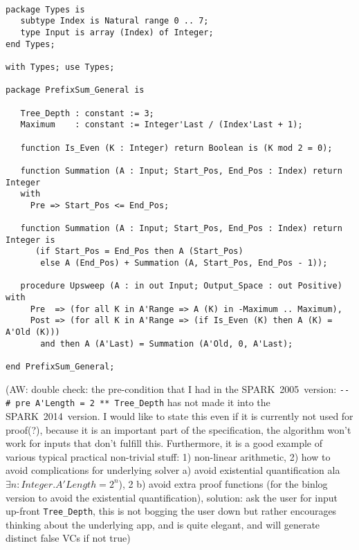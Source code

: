 \documentclass[sttt,draft]{svjour}
\newcommand{\oldspark}{SPARK~2005\xspace}
\newcommand{\newspark}{SPARK~2014\xspace}
\begin{document}
\begin{footnotesize}
\begin{verbatim}

package Types is
   subtype Index is Natural range 0 .. 7;
   type Input is array (Index) of Integer;
end Types;

with Types; use Types;

package PrefixSum_General is

   Tree_Depth : constant := 3;
   Maximum    : constant := Integer'Last / (Index'Last + 1);

   function Is_Even (K : Integer) return Boolean is (K mod 2 = 0);

   function Summation (A : Input; Start_Pos, End_Pos : Index) return Integer
   with
     Pre => Start_Pos <= End_Pos;

   function Summation (A : Input; Start_Pos, End_Pos : Index) return Integer is
      (if Start_Pos = End_Pos then A (Start_Pos)
       else A (End_Pos) + Summation (A, Start_Pos, End_Pos - 1));

   procedure Upsweep (A : in out Input; Output_Space : out Positive) with
     Pre  => (for all K in A'Range => A (K) in -Maximum .. Maximum),
     Post => (for all K in A'Range => (if Is_Even (K) then A (K) = A'Old (K)))
       and then A (A'Last) = Summation (A'Old, 0, A'Last);

end PrefixSum_General;

\end{verbatim}
\end{footnotesize}
%
(AW: double check: the pre-condition that I had in the \oldspark\
version: \verb|--# pre A'Length = 2 ** Tree_Depth| has not made it
into the \newspark\ version. I would like to state this even if it is
currently not used for proof(?), because it is an important part of
the specification, the algorithm won't work for inputs that don't
fulfill this. Furthermore, it is a good example of various typical
practical non-trivial stuff: 1) non-linear arithmetic, 2) how to avoid
complications for underlying solver a) avoid existential
quantification ala $\exists n: Integer. A'Length = 2^n$), 2 b) avoid
extra proof functions (for the binlog version to avoid the existential
quantification), solution: ask the user for input up-front
\verb|Tree_Depth|, this is not bogging the user down but rather
encourages thinking about the underlying app, and is quite elegant,
and will generate distinct false VCs if not true)
%
\end{document}
